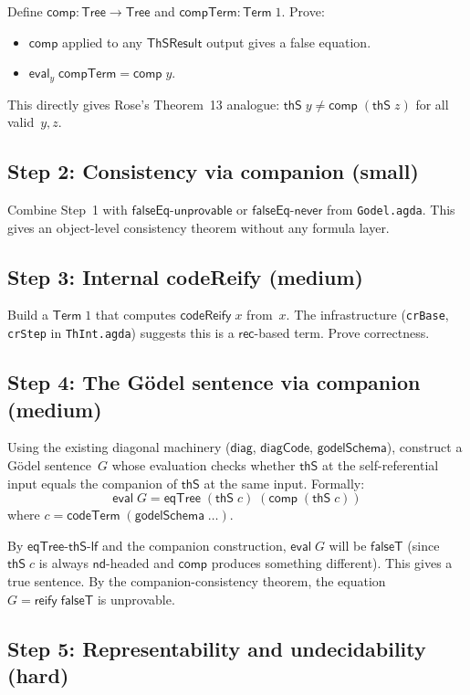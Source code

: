 \documentclass[11pt]{article}
\newcommand{\lf}{\mathsf{lf}}
\newcommand{\nd}{\mathsf{nd}}
\newcommand{\rec}{\mathsf{rec}}
\newcommand{\eval}{\mathsf{eval}}
\newcommand{\reify}{\mathsf{reify}}
\newcommand{\codeTerm}{\mathsf{codeTerm}}
\newcommand{\codeReify}{\mathsf{codeReify}}
\newcommand{\diagCode}{\mathsf{diagCode}}
\newcommand{\diag}{\mathsf{diag}}
\newcommand{\thS}{\mathsf{thS}}
\newcommand{\eqTree}{\mathsf{eqTree}}
\newcommand{\Tree}{\mathsf{Tree}}
\newcommand{\Term}{\mathsf{Term}}
\newcommand{\ThSResult}{\mathsf{ThSResult}}
\newcommand{\comp}{\mathsf{comp}}
\begin{document}
Define $\comp : \Tree \to \Tree$ and $\mathsf{compTerm} : \Term\;1$.
Prove:
\begin{itemize}
  \item $\comp$ applied to any $\ThSResult$ output gives a false equation.
  \item $\eval_y\;\mathsf{compTerm} = \comp\;y$.
\end{itemize}
This directly gives Rose's Theorem~13 analogue:
$\thS\;y \neq \comp\;(\thS\;z)$ for all valid~$y, z$.

\subsection{Step 2: Consistency via companion (small)}

Combine Step~1 with $\mathsf{falseEq\text{-}unprovable}$ or
$\mathsf{falseEq\text{-}never}$ from \texttt{Godel.agda}. This
gives an object-level consistency theorem without any formula layer.

\subsection{Step 3: Internal codeReify (medium)}

Build a $\Term\;1$ that computes $\codeReify\;x$ from~$x$.
The infrastructure (\texttt{crBase}, \texttt{crStep} in
\texttt{ThInt.agda}) suggests this is a $\rec$-based term.
Prove correctness.

\subsection{Step 4: The G\"odel sentence via companion (medium)}

Using the existing diagonal machinery ($\diag$, $\diagCode$,
$\mathsf{godelSchema}$), construct a G\"odel sentence~$G$ whose
evaluation checks whether $\thS$ at the self-referential input
equals the companion of $\thS$ at the same input.  Formally:
\[
  \eval\;G = \eqTree\;(\thS\;c)\;(\comp\;(\thS\;c))
\]
where $c = \codeTerm\;(\mathsf{godelSchema}\;\ldots)$.

By $\eqTree$-$\thS$-$\lf$ and the companion construction, $\eval\;G$
will be $\mathsf{falseT}$ (since $\thS\;c$ is always $\nd$-headed
and $\comp$ produces something different).  This gives a true
sentence.  By the companion-consistency theorem, the equation
$G = \reify\;\mathsf{falseT}$ is unprovable.

\subsection{Step 5: Representability and undecidability (hard)}
\end{document}
